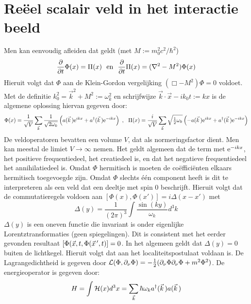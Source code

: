 \section[~~Re\"eel scalair veld in het interactie beeld]{Re\"eel scalair veld in het interactie beeld}
Men kan eenvoudig afleiden dat geldt (met $M:=m_0^2c^2/\hbar^2$)
\[
\frac{\partial }{\partial t}\Phi(x)=\Pi(x)~~\mbox{en}~~\frac{\partial }{\partial t}\Pi(x)=(\nabla^2-M^2)\Phi(x)
\]
Hieruit volgt dat $\Phi$ aan de Klein-Gordon vergelijking $(\Box-M^2)\Phi=0$
voldoet. Met de definitie $k_0^2=\vec{k}^2+M^2:=\omega_k^2$ en schrijfwijze
$\vec{k}\cdot\vec{x}-ik_0t:=kx$ is de algemene oplossing hiervan gegeven door:
\[
\Phi(x)=\frac{1}{\sqrt{V}}\sum_{\vec{k}}\frac{1}{\sqrt{2\omega_k}}
\left(a(\vec{k}\,){\rm e}^{ikx}+a^\dagger(\vec{k}\,){\rm e}^{-ikx}\right)
~,~~
\Pi(x)=\frac{i}{\sqrt{V}}\sum_{\vec{k}}\sqrt{\mbox{$\frac{1}{2}$}\omega_k}
\left(-a(\vec{k}\,){\rm e}^{ikx}+a^\dagger(\vec{k}\,){\rm e}^{-ikx}\right)
\]
De veldoperatoren bevatten een volume $V$, dat als normeringsfactor dient.
Men kan meestal de limiet $V\rightarrow\infty$ nemen.
\npar
Het geldt algemeen dat de term met ${\rm e}^{-ikx}$, het positieve
frequentiedeel, het creatiedeel is, en dat het negatieve frequentiedeel het
annihilatiedeel is.
\npar
Omdat $\Phi$ hermitisch is moeten de co\"effici\"enten elkaars hermitisch
toegevoegde zijn. Omdat $\Phi$ slechts \'e\'en component heeft is dit te
interpreteren als een veld dat een deeltje met spin 0 beschrijft. Hieruit
volgt dat de commutatieregels voldoen aan $[\Phi(x),\Phi(x')]=i\Delta(x-x')$
met
\[
\Delta(y)=\frac{1}{(2\pi)^3}\int\frac{\sin(ky)}{\omega_k}d^3k
\]
$\Delta(y)$ is een oneven functie die invariant is onder eigenlijke
Lorentztransformaties (geen spiegelingen). Dit is consistent met het eerder
gevonden resultaat $[\Phi(\vec{x},t,\Phi(\vec{x}\,',t)]=0$. In het algemeen
geldt dat $\Delta(y)=0$ buiten de lichtkegel. Hieruit volgt dat aan het
localiteitspostulaat voldaan is.
\npar
De Lagrangedichtheid is gegeven door
${\cal L}(\Phi,\partial_\nu\Phi)=-\mbox{$\frac{1}{2}$}(\partial_\nu\Phi\partial_\nu\Phi+m^2\Phi^2)$.
De energieoperator is gegeven door:
\[
H=\int{\cal H}(x)d^3x=\sum_{\vec{k}}\hbar\omega_ka^\dagger(\vec{k}\,)a(\vec{k}\,)
\]

